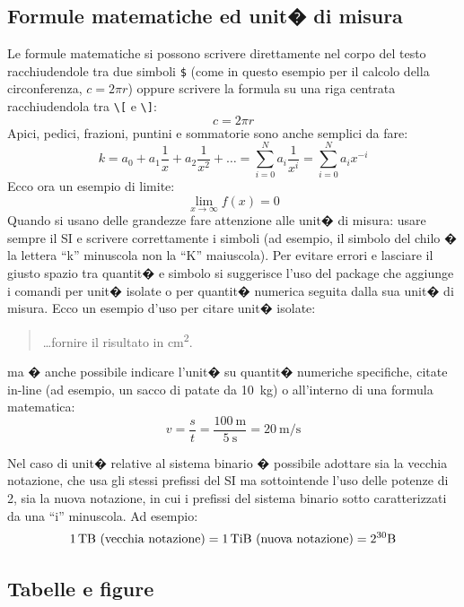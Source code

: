 
\subsection{Formule matematiche ed unit� di misura}

Le formule matematiche si possono scrivere direttamente nel corpo del testo racchiudendole tra due simboli \verb+$+
(come in questo esempio per il calcolo della circonferenza, $c = 2 \pi r$)
oppure scrivere la formula su una riga centrata racchiudendola tra \verb+\[+ e \verb+\]+:
\[
c = 2 \pi r
\]
Apici, pedici, frazioni, puntini e sommatorie sono anche semplici da fare:
\[
k = a_0 + a_1 \frac{1}{x} + a_2 \frac{1}{x^2} + \dots = \sum_{i=0}^N a_i \frac{1}{x^i} = \sum_{i=0}^N a_i x^{-i}
\]
Ecco ora un esempio di limite:
\[
\lim_{x\to\infty}f(x)=0
\]
Quando si usano delle grandezze fare attenzione alle unit� di misura: usare sempre il SI e scrivere correttamente i simboli (ad esempio, il simbolo del chilo � la lettera ``k'' minuscola non la ``K'' maiuscola).
Per evitare errori e lasciare il giusto spazio tra quantit� e simbolo si suggerisce l'uso del package  che aggiunge i comandi  per unit� isolate o  per quantit� numerica seguita dalla sua unit� di misura.
Ecco un esempio d'uso per citare unit� isolate:
\begin{quote}
\ldots fornire il risultato in \si{\square\centi\metre}.
\end{quote}
ma � anche possibile indicare l'unit� su quantit� numeriche specifiche, citate in-line (ad esempio, un sacco di patate da \SI{10}{\kilo\gram}) o all'interno di una formula matematica:
\[
v = \frac{s}{t} = \frac{ \SI{100}{\meter} }{ \SI{5}{\second} } = \SI{20}{\meter\per\second}
\]

Nel caso di unit� relative al sistema binario � possibile adottare sia la vecchia notazione, che usa gli stessi prefissi del SI ma sottointende l'uso delle potenze di 2, sia la nuova notazione, in cui i prefissi del sistema binario sotto caratterizzati da una ``i'' minuscola.
Ad esempio:
\[
\SI{1}{\tera\byte}\ \mbox{(vecchia notazione)} =
\SI{1}{\tebi\byte}\ \mbox{(nuova notazione)} =
2^{30} \si{\byte}
\]


\subsection{Tabelle e figure}


